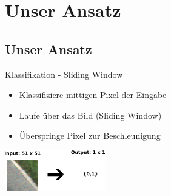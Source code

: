 \section{Unser Ansatz}
\subsection{Unser Ansatz}

\begin{frame}{Klassifikation - Sliding Window}
\begin{minipage}{0.59\textwidth}
\begin{itemize}
\item Klassifiziere mittigen Pixel der Eingabe \\
\item Laufe über das Bild (Sliding Window) \\
\item Überspringe Pixel zur Beschleunigung
\end{itemize}
\end{minipage}
\begin{minipage}{0.39\textwidth}
	\flushright
      \includegraphics[]{../images/models/sliding_window.png}
\end{minipage}


\end{frame}

